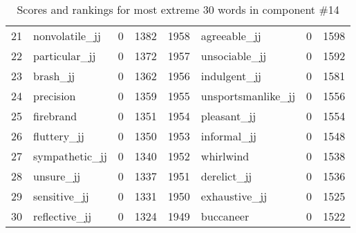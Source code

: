 \begin{table}[tbp]
\begin{tabular}{| rlr@{.}l | rlr@{.}l |}
    21 & nonvolatile\_jj & 0 & 1382    &    1958 & agreeable\_jj & 0 & 1598 \\
    22 & particular\_jj & 0 & 1372    &    1957 & unsociable\_jj & 0 & 1592 \\
    23 & brash\_jj & 0 & 1362    &    1956 & indulgent\_jj & 0 & 1581 \\
    24 & precision & 0 & 1359    &    1955 & unsportsmanlike\_jj & 0 & 1556 \\
    25 & firebrand & 0 & 1351    &    1954 & pleasant\_jj & 0 & 1554 \\
    26 & fluttery\_jj & 0 & 1350    &    1953 & informal\_jj & 0 & 1548 \\
    27 & sympathetic\_jj & 0 & 1340    &    1952 & whirlwind & 0 & 1538 \\
    28 & unsure\_jj & 0 & 1337    &    1951 & derelict\_jj & 0 & 1536 \\
    29 & sensitive\_jj & 0 & 1331    &    1950 & exhaustive\_jj & 0 & 1525 \\
    30 & reflective\_jj & 0 & 1324    &    1949 & buccaneer & 0 & 1522 \\
    \hline
    \end{tabular}
    \caption{Scores and rankings for most extreme 30 words in component \#14} 
\end{table}
\clearpage

